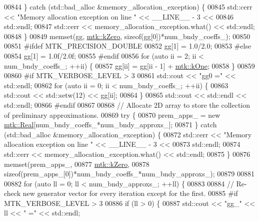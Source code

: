 \begin{DoxyCode}
{{00844   \} \textcolor{keywordflow}{catch} (std::bad\_alloc &memory\_allocation\_exception) \{
00845     std::cerr << \textcolor{stringliteral}{"Memory allocation exception on line "} << \_\_LINE\_\_ - 3 <<
00846       std::endl;
00847     std::cerr << memory\_allocation\_exception.what() << std::endl;
00848   \}
00849   memset(gg, \hyperlink{group__c01-roots_ga59a451a5fae30d59649bcda274fea271}{mtk::kZero}, \textcolor{keyword}{sizeof}(gg[0])*num\_bndy\_coeffs\_);
00850 
00851 \textcolor{preprocessor}{  #ifdef MTK\_PRECISION\_DOUBLE}
00852   gg[1] = 1.0/2.0;
00853 \textcolor{preprocessor}{  #else}
00854   gg[1] = 1.0f/2.0f;
00855 \textcolor{preprocessor}{  #endif}
00856   \textcolor{keywordflow}{for} (\textcolor{keyword}{auto} ii = 2; ii < num\_bndy\_coeffs\_; ++ii) \{
00857     gg[ii] = gg[ii - 1] + \hyperlink{group__c01-roots_ga26407c24d43b6b95480943340d285c71}{mtk::kOne};
00858   \}
00859 
00860 \textcolor{preprocessor}{  #if MTK\_VERBOSE\_LEVEL > 3}
00861   std::cout << \textcolor{stringliteral}{"gg0 ="} << std::endl;
00862   \textcolor{keywordflow}{for} (\textcolor{keyword}{auto} ii = 0; ii < num\_bndy\_coeffs\_; ++ii) \{
00863     std::cout << std::setw(12) << gg[ii];
00864   \}
00865   std::cout << std::endl << std::endl;
00866 \textcolor{preprocessor}{  #endif}
00867 
00868   \textcolor{comment}{// Allocate 2D array to store the collection of preliminary approximations.}
00869   \textcolor{keywordflow}{try} \{
00870     prem\_apps\_ = \textcolor{keyword}{new} \hyperlink{group__c01-roots_gac080bbbf5cbb5502c9f00405f894857d}{mtk::Real}[num\_bndy\_coeffs\_*num\_bndy\_approxs\_];
00871   \} \textcolor{keywordflow}{catch} (std::bad\_alloc &memory\_allocation\_exception) \{
00872     std::cerr << \textcolor{stringliteral}{"Memory allocation exception on line "} << \_\_LINE\_\_ - 3 <<
00873 std::endl;
00874     std::cerr << memory\_allocation\_exception.what() << std::endl;
00875   \}
00876   memset(prem\_apps\_,
00877          \hyperlink{group__c01-roots_ga59a451a5fae30d59649bcda274fea271}{mtk::kZero},
00878          \textcolor{keyword}{sizeof}(prem\_apps\_[0])*num\_bndy\_coeffs\_*num\_bndy\_approxs\_);
00879 
00881 
00882   \textcolor{keywordflow}{for} (\textcolor{keyword}{auto} ll = 0; ll < num\_bndy\_approxs\_; ++ll) \{
00883 
00884     \textcolor{comment}{// Re-check new generator vector for every iteration except for the first.}
00885 \textcolor{preprocessor}{    #if MTK\_VERBOSE\_LEVEL > 3}
00886     \textcolor{keywordflow}{if} (ll > 0) \{
00887       std::cout << \textcolor{stringliteral}{"gg\_"} << ll << \textcolor{stringliteral}{" ="} << std::endl;
}}
\end{DoxyCode}
